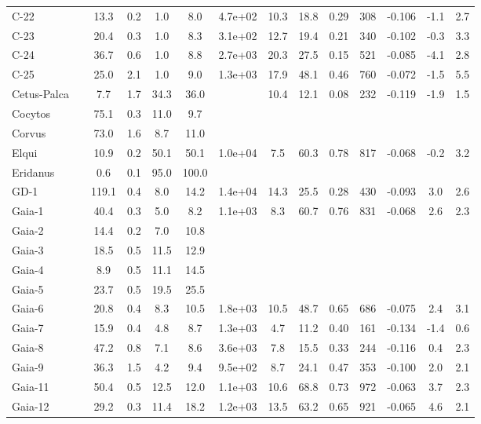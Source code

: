\begin{tabular}{llSSSSSSSSrSSS}
C-22 &  & 13.3 & 0.2 & 1.0 & 8.0 & 4.7e+02 & 10.3 & 18.8 & 0.29 & 308 & -0.106 & -1.1 & 2.7 \\
C-23 &  & 20.4 & 0.3 & 1.0 & 8.3 & 3.1e+02 & 12.7 & 19.4 & 0.21 & 340 & -0.102 & -0.3 & 3.3 \\
C-24 &  & 36.7 & 0.6 & 1.0 & 8.8 & 2.7e+03 & 20.3 & 27.5 & 0.15 & 521 & -0.085 & -4.1 & 2.8 \\
C-25 &  & 25.0 & 2.1 & 1.0 & 9.0 & 1.3e+03 & 17.9 & 48.1 & 0.46 & 760 & -0.072 & -1.5 & 5.5 \\
Cetus-Palca &  & 7.7 & 1.7 & 34.3 & 36.0 &  & 10.4 & 12.1 & 0.08 & 232 & -0.119 & -1.9 & 1.5 \\
Cocytos &  & 75.1 & 0.3 & 11.0 & 9.7 &  &  &  &  &  &  &  &  \\
Corvus &  & 73.0 & 1.6 & 8.7 & 11.0 &  &  &  &  &  &  &  &  \\
Elqui &  & 10.9 & 0.2 & 50.1 & 50.1 & 1.0e+04 & 7.5 & 60.3 & 0.78 & 817 & -0.068 & -0.2 & 3.2 \\
Eridanus &  & 0.6 & 0.1 & 95.0 & 100.0 &  &  &  &  &  &  &  &  \\
GD-1 &  & 119.1 & 0.4 & 8.0 & 14.2 & 1.4e+04 & 14.3 & 25.5 & 0.28 & 430 & -0.093 & 3.0 & 2.6 \\
Gaia-1 &  & 40.4 & 0.3 & 5.0 & 8.2 & 1.1e+03 & 8.3 & 60.7 & 0.76 & 831 & -0.068 & 2.6 & 2.3 \\
Gaia-2 &  & 14.4 & 0.2 & 7.0 & 10.8 &  &  &  &  &  &  &  &  \\
Gaia-3 &  & 18.5 & 0.5 & 11.5 & 12.9 &  &  &  &  &  &  &  &  \\
Gaia-4 &  & 8.9 & 0.5 & 11.1 & 14.5 &  &  &  &  &  &  &  &  \\
Gaia-5 &  & 23.7 & 0.5 & 19.5 & 25.5 &  &  &  &  &  &  &  &  \\
Gaia-6 &  & 20.8 & 0.4 & 8.3 & 10.5 & 1.8e+03 & 10.5 & 48.7 & 0.65 & 686 & -0.075 & 2.4 & 3.1 \\
Gaia-7 &  & 15.9 & 0.4 & 4.8 & 8.7 & 1.3e+03 & 4.7 & 11.2 & 0.40 & 161 & -0.134 & -1.4 & 0.6 \\
Gaia-8 &  & 47.2 & 0.8 & 7.1 & 8.6 & 3.6e+03 & 7.8 & 15.5 & 0.33 & 244 & -0.116 & 0.4 & 2.3 \\
Gaia-9 &  & 36.3 & 1.5 & 4.2 & 9.4 & 9.5e+02 & 8.7 & 24.1 & 0.47 & 353 & -0.100 & 2.0 & 2.1 \\
Gaia-11 &  & 50.4 & 0.5 & 12.5 & 12.0 & 1.1e+03 & 10.6 & 68.8 & 0.73 & 972 & -0.063 & 3.7 & 2.3 \\
Gaia-12 &  & 29.2 & 0.3 & 11.4 & 18.2 & 1.2e+03 & 13.5 & 63.2 & 0.65 & 921 & -0.065 & 4.6 & 2.1 \\

\end{tabular}
